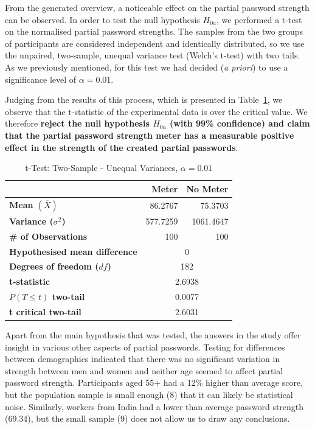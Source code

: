     From the generated overview, a noticeable effect on the partial password strength can be observed. In order to test the null hypothesis $H_{0a}$, we performed a t-test on the normalised partial password strengths. The samples from the two groups of participants are considered independent and identically distributed, so we use the unpaired, two-sample, unequal variance test (Welch's t-test) with two tails. As we previously mentioned, for this test we had decided (\emph{a priori}) to use a significance level of $\alpha = 0.01$.

    Judging from the results of this process, which is presented in Table~\ref{tab:t-test}, we observe that the t-statistic of the experimental data is over the critical value. We therefore \textbf{reject the null hypothesis $H_{0a}$ (with 99\% confidence) and claim that the partial password strength meter has a measurable positive effect in the strength of the created partial passwords}.

    \begin{table}[htpb]
      \centering
      \begin{tabular}{l r r}
      \toprule
      & \textbf{Meter} & \textbf{No Meter} \\
      \midrule
      \textbf{Mean $(\overline{X})$} & 86.2767 & 75.3703 \\
      \textbf{Variance ($\sigma^2$)} & 577.7259 & 1061.4647 \\
      \textbf{\# of Observations} & 100 & 100 \\
      \midrule
      \textbf{Hypothesised mean difference} & \multicolumn{2}{c}{0} \\
      \textbf{Degrees of freedom ($df$)} & \multicolumn{2}{c}{182} \\
      \textbf{t-statistic} & \multicolumn{2}{c}{2.6938} \\
      \textbf{$P(T\leq t)$ two-tail} & \multicolumn{2}{c}{0.0077} \\
      \textbf{t critical two-tail} & \multicolumn{2}{c}{2.6031} \\
      \bottomrule
      \end{tabular}
      \caption{t-Test: Two-Sample - Unequal Variances, $\alpha = 0.01$}
      \label{tab:t-test}
    \end{table}

    Apart from the main hypothesis that was tested, the answers in the study offer insight in various other aspects of partial passwords. Testing for differences between demographics indicated that there was no significant variation in strength between men and women and neither age seemed to affect partial password strength. Participants aged 55+ had a 12\% higher than average score, but the population sample is small enough (8) that it can likely be statistical noise. Similarly, workers from India had a lower than average password strength (69.34), but the small sample (9) does not allow us to draw any conclusions.

